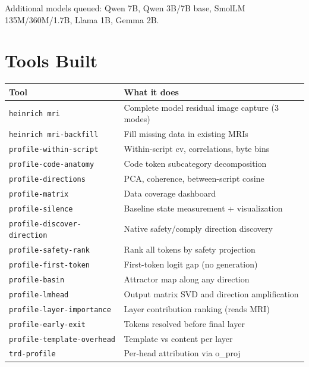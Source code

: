 \documentclass[11pt,a4paper]{report}
\begin{document}
Additional models queued: Qwen 7B, Qwen 3B/7B base, SmolLM 135M/360M/1.7B, Llama 1B, Gemma 2B.

\chapter{Tools Built}

\begin{longtable}{p{5cm}p{9cm}}
\toprule
\textbf{Tool} & \textbf{What it does} \\
\midrule
\endhead
\texttt{heinrich mri} & Complete model residual image capture (3 modes) \\
\texttt{heinrich mri-backfill} & Fill missing data in existing MRIs \\
\texttt{profile-within-script} & Within-script cv, correlations, byte bins \\
\texttt{profile-code-anatomy} & Code token subcategory decomposition \\
\texttt{profile-directions} & PCA, coherence, between-script cosine \\
\texttt{profile-matrix} & Data coverage dashboard \\
\texttt{profile-silence} & Baseline state measurement + visualization \\
\texttt{profile-discover-direction} & Native safety/comply direction discovery \\
\texttt{profile-safety-rank} & Rank all tokens by safety projection \\
\texttt{profile-first-token} & First-token logit gap (no generation) \\
\texttt{profile-basin} & Attractor map along any direction \\
\texttt{profile-lmhead} & Output matrix SVD and direction amplification \\
\texttt{profile-layer-importance} & Layer contribution ranking (reads MRI) \\
\texttt{profile-early-exit} & Tokens resolved before final layer \\
\texttt{profile-template-overhead} & Template vs content per layer \\
\texttt{trd-profile} & Per-head attribution via o\_proj \\
\bottomrule
\end{longtable}

\end{document}
